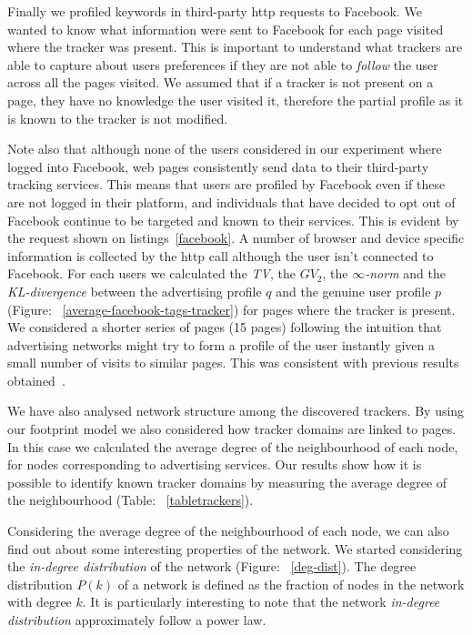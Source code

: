 Finally we profiled keywords in third-party http requests to Facebook. We wanted to know what information were sent to Facebook for each page visited where the tracker was present. This is important to understand what trackers are able to capture about users preferences if they are not able to \emph{follow} the user across all the pages visited. We assumed that if a tracker is not present on a page, they have no knowledge the user visited it, therefore the partial profile as it is known to the tracker is not modified.

Note also that although none of the users considered in our experiment where logged into Facebook, web pages consistently send data to their third-party tracking services. This means that users are profiled by Facebook even if these are not logged in their platform, and individuals that have decided to opt out of Facebook continue to be targeted and known to their services. This is evident by the request shown on listings~\ref{facebook}. A number of browser and device specific information is collected by the http call although the user isn't connected to Facebook. For each users we calculated the \emph{TV}, the \emph{$GV_2$}, the \emph{$\infty$-norm} and the \emph{KL-divergence} between the advertising profile $q$ and the genuine user profile $p$ (Figure: ~\ref{average-facebook-tags-tracker}) for pages where the tracker is present. We considered a shorter series of pages (15 pages) following the intuition that advertising networks might try to form a profile of the user instantly given a small number of visits to similar pages. This was consistent with previous results obtained~\cite{puglisi2015you}. 

We have also analysed network structure among the discovered trackers. By using our footprint model we also considered how tracker domains are linked to pages. In this case we calculated the average degree of the neighbourhood of each node, for nodes corresponding to advertising services. Our results show how it is possible to identify known tracker domains by measuring the average degree of the neighbourhood (Table: ~\ref{tabletrackers}). 

Considering the average degree of the neighbourhood of each node, we can also find out about some interesting properties of the network. We started considering the \emph{in-degree distribution} of the network (Figure: ~\ref{deg-dist}). The degree distribution $P(k)$ of a network is defined as the fraction of nodes in the network with degree $k$. It is particularly interesting to note that the network \emph{in-degree distribution} approximately follow a power law.

